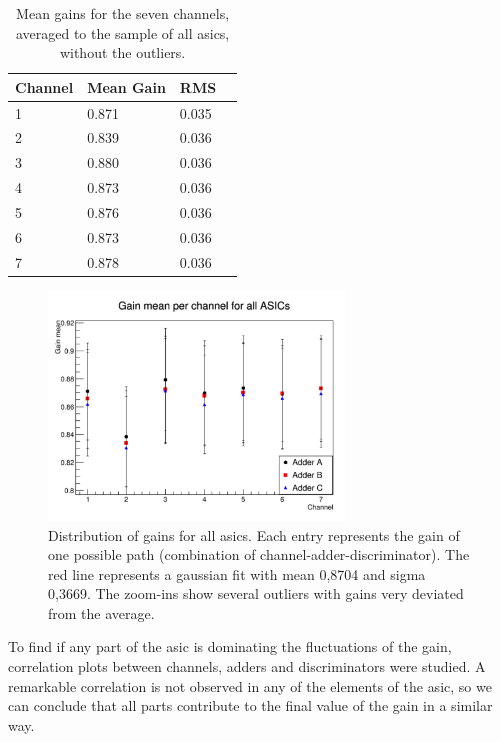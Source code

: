 \documentclass[main.tex]{subfiles}
\begin{document}
\begin{table}
  \centering
  \begin{tabular}{|l|l|l|l|}
    \hline
    Channel & Mean Gain & RMS \\
    \hline
    1 & 0.871 & 0.035 \\
    2 & 0.839 & 0.036 \\
    3 & 0.880 & 0.036 \\
    4 & 0.873 & 0.036 \\
    5 & 0.876 & 0.036 \\
    6 & 0.873 & 0.036 \\
    7 & 0.878 & 0.036 \\
    \hline
  \end{tabular}
  \caption{\label{tab:gainch} Mean gains for the seven channels, averaged to the sample of all asics, without the outliers.}
\end{table}

\begin{figure}[h]
  \centering
  \includegraphics[width=0.7\textwidth]{./Pictures/gainschannel.pdf}
  \caption{Distribution of gains for all \glspl{asic}. Each entry represents the gain of one possible path (combination of channel-adder-discriminator). The red line represents a gaussian fit with mean 0,8704 and sigma 0,3669.
    The zoom-ins show several outliers with gains very deviated from the average. }\label{fig:gainch}
\end{figure}

To find if any part of the \gls{asic} is dominating the fluctuations of the gain, correlation plots between channels, adders and discriminators were studied. A remarkable correlation is not observed in any of the elements of the \gls{asic}, so we can conclude that all parts contribute to the final value of the gain in a similar way. 
\end{document}
